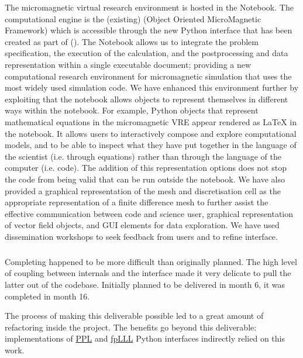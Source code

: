 The micromagnetic virtual research environment is hosted in the \Jupyter
Notebook. The computational engine is the (existing) \OOMMF (Object Oriented
MicroMagnetic Framework) which is accessible through the new Python interface
that has been created as part of \ODK
(). The \Jupyter Notebook allows us to
integrate the problem specification, the execution of the calculation, and the
postprocessing and data representation within a single executable document;
providing a new computational research environment for micromagnetic
simulation that uses the most widely used simulation code. We have enhanced
this environment further by exploiting that the notebook allows objects to
represent themselves in different ways within the notebook. For example,
Python objects that represent mathematical equations in the micromagnetic VRE
appear rendered as \LaTeX{} in the notebook. It allows users to interactively
compose and explore computational models, and to be able to inspect what they
have put together in the language of the scientist (i.e. through equations)
rather than through the language of the computer (i.e. code). The addition of
this representation options does not stop the code from being valid \Python
that can be run outside the notebook. We have also provided a graphical
representation of the mesh and discretisation cell as the appropriate
representation of a finite difference mesh to further assist the effective
communication between code and science user, graphical representation of
vector field objects, and GUI elements for data exploration. We have used dissemination workshops
to seek feedback from users and to refine interface.

\subparagraph{}
\label{UI@pari-python}


Completing  happened to be more difficult than
originally planned. The high level of coupling between \Sage internals
and the \Pari interface made it very delicate to pull the latter out
of the \Sage codebase. Initially planned to be delivered in month 6,
it was completed in month 16.

The process of making this deliverable possible led to a great amount
of refactoring inside the \Sage project.
The benefits go beyond this deliverable:
implementations of \href{https://github.com/videlec/pplpy}{PPL}
and \href{https://github.com/fplll/fpylll}{fpLLL}
Python interfaces indirectly relied on this work.

